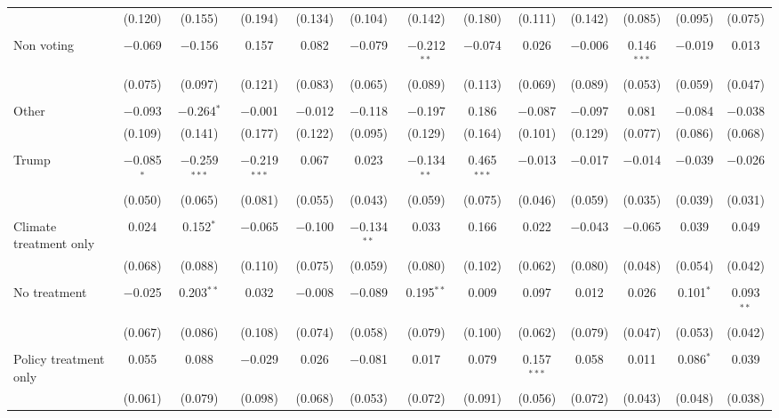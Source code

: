 \begin{tabular}{@{\extracolsep{5pt}}lcccccccccccc}
  & (0.120) & (0.155) & (0.194) & (0.134) & (0.104) & (0.142) & (0.180) & (0.111) & (0.142) & (0.085) & (0.095) & (0.075) \\ 
  & & & & & & & & & & & & \\ 
 Non voting & $-$0.069 & $-$0.156 & 0.157 & 0.082 & $-$0.079 & $-$0.212$^{**}$ & $-$0.074 & 0.026 & $-$0.006 & 0.146$^{***}$ & $-$0.019 & 0.013 \\ 
  & (0.075) & (0.097) & (0.121) & (0.083) & (0.065) & (0.089) & (0.113) & (0.069) & (0.089) & (0.053) & (0.059) & (0.047) \\ 
  & & & & & & & & & & & & \\ 
 Other & $-$0.093 & $-$0.264$^{*}$ & $-$0.001 & $-$0.012 & $-$0.118 & $-$0.197 & 0.186 & $-$0.087 & $-$0.097 & 0.081 & $-$0.084 & $-$0.038 \\ 
  & (0.109) & (0.141) & (0.177) & (0.122) & (0.095) & (0.129) & (0.164) & (0.101) & (0.129) & (0.077) & (0.086) & (0.068) \\ 
  & & & & & & & & & & & & \\ 
 Trump & $-$0.085$^{*}$ & $-$0.259$^{***}$ & $-$0.219$^{***}$ & 0.067 & 0.023 & $-$0.134$^{**}$ & 0.465$^{***}$ & $-$0.013 & $-$0.017 & $-$0.014 & $-$0.039 & $-$0.026 \\ 
  & (0.050) & (0.065) & (0.081) & (0.055) & (0.043) & (0.059) & (0.075) & (0.046) & (0.059) & (0.035) & (0.039) & (0.031) \\ 
  & & & & & & & & & & & & \\ 
 Climate treatment only & 0.024 & 0.152$^{*}$ & $-$0.065 & $-$0.100 & $-$0.134$^{**}$ & 0.033 & 0.166 & 0.022 & $-$0.043 & $-$0.065 & 0.039 & 0.049 \\ 
  & (0.068) & (0.088) & (0.110) & (0.075) & (0.059) & (0.080) & (0.102) & (0.062) & (0.080) & (0.048) & (0.054) & (0.042) \\ 
  & & & & & & & & & & & & \\ 
 No treatment & $-$0.025 & 0.203$^{**}$ & 0.032 & $-$0.008 & $-$0.089 & 0.195$^{**}$ & 0.009 & 0.097 & 0.012 & 0.026 & 0.101$^{*}$ & 0.093$^{**}$ \\ 
  & (0.067) & (0.086) & (0.108) & (0.074) & (0.058) & (0.079) & (0.100) & (0.062) & (0.079) & (0.047) & (0.053) & (0.042) \\ 
  & & & & & & & & & & & & \\ 
 Policy treatment only & 0.055 & 0.088 & $-$0.029 & 0.026 & $-$0.081 & 0.017 & 0.079 & 0.157$^{***}$ & 0.058 & 0.011 & 0.086$^{*}$ & 0.039 \\ 
  & (0.061) & (0.079) & (0.098) & (0.068) & (0.053) & (0.072) & (0.091) & (0.056) & (0.072) & (0.043) & (0.048) & (0.038) \\ 

\end{tabular}
